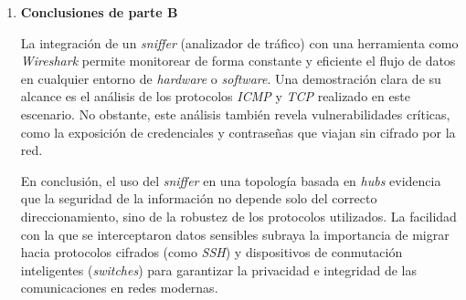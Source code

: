 \begin{enumerate}[resume=labsteps]
\begin{itemize}
\begin{verbatim}
"132","23.348629300","10.0.0.2","10.0.0.1","TCP","60  ...
"133","23.537768600","10.0.0.2","10.0.0.1","TELNET",  ...
"134","23.538156000","10.0.0.1","10.0.0.2","TELNET",  ...
"135","23.588320500","10.0.0.2","10.0.0.1","TCP","60  ...
"136","23.633371900","10.0.0.2","10.0.0.1","TELNET",  ...
"137","23.633371900","10.0.0.1","10.0.0.2","TELNET",  ...
"138","23.683906000","10.0.0.2","10.0.0.1","TCP","60  ...
"140","23.807700900","10.0.0.2","10.0.0.1","TELNET",  ...
"141","23.808947800","10.0.0.1","10.0.0.2","TELNET",  ...
"142","23.859881400","10.0.0.2","10.0.0.1","TCP","60  ...
"143","23.970042300","10.0.0.2","10.0.0.1","TELNET",  ...
"144","23.970390700","10.0.0.1","10.0.0.2","TELNET",  ...
... 
... 
... 
\end{verbatim}




\end{itemize}

\item \textbf{Conclusiones de parte B}

La integración de un \textit{sniffer} (analizador de tráfico) con una herramienta como 
\textit{Wireshark} permite monitorear de forma constante y eficiente el flujo de datos 
en cualquier entorno de \textit{hardware} o \textit{software}. Una demostración clara 
de su alcance es el análisis de los protocolos \textit{ICMP} y \textit{TCP} realizado 
en este escenario. No obstante, este análisis también revela vulnerabilidades críticas, 
como la exposición de credenciales y contraseñas que viajan sin cifrado por la red.

En conclusión, el uso del \textit{sniffer} en una topología basada en \textit{hubs} 
evidencia que la seguridad de la información no depende solo del correcto direccionamiento, 
sino de la robustez de los protocolos utilizados. La facilidad con la que se interceptaron 
datos sensibles subraya la importancia de migrar hacia protocolos cifrados (como \textit{SSH}) 
y dispositivos de conmutación inteligentes (\textit{switches}) para garantizar la privacidad e 
integridad de las comunicaciones en redes modernas.

\end{enumerate}

